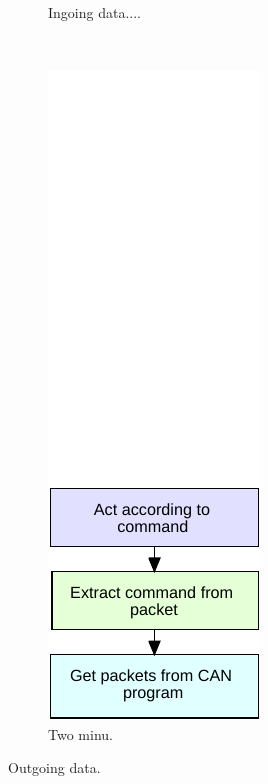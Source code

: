 \begin{figure}[!h]
\begin{subfigure}[b]{0.29\textwidth}
        \caption{Ingoing data....}
        \label{fig:filter_full}
    \end{subfigure}
    ~
    \begin{subfigure}[b]{0.30\textwidth}
        \includegraphics[width=\textwidth]{graphics/FlowChart_Node_Unpacking}
        \caption{Two minu.}
        \label{fig:filter_2}
    \end{subfigure}
        \caption{Outgoing data.}
           \label{fig:filter_fulll}
\end{figure}

